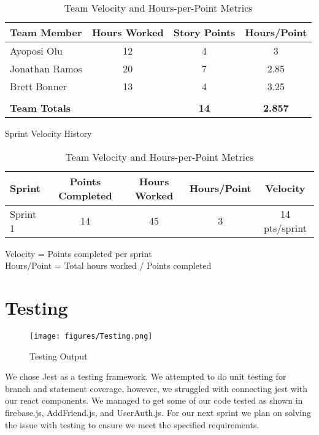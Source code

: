 \documentclass[12pt]{article} %
\begin{document}
\begin{table}[h]
\centering
\caption{Team Velocity and Hours-per-Point Metrics}
\begin{tabular}{|l|c|c|c|}
\hline
\textbf{Team Member} & \textbf{Hours Worked} & \textbf{Story Points} & \textbf{Hours/Point} \\
\hline
Ayoposi Olu & 12 & 4 & 3 \\
\hline
Jonathan Ramos & 20 & 7 & 2.85 \\
\hline
Brett Bonner & 13 & 4 & 3.25 \\
\hline
\multicolumn{4}{|c|}{} \\
\hline
\multicolumn{2}{|l|}{\textbf{Team Totals}} & \textbf{14} & \textbf{2.857} \\
\hline
\end{tabular}

\begin{center}
\small{Sprint Velocity History}
\end{center}
\begin{tabular}{|l|c|c|c|c|}
\hline
\textbf{Sprint} & \textbf{Points Completed} & \textbf{Hours Worked} & \textbf{Hours/Point} & \textbf{Velocity} \\
\hline
Sprint 1 & 14 & 45 & 3 & 14 pts/sprint \\
\hline
\end{tabular}

\vspace{0.5cm}
\begin{center}
\small{Velocity = Points completed per sprint \\
Hours/Point = Total hours worked / Points completed}
\end{center}
\end{table}

\newpage

\section {Testing}
\begin{figure}
    \centering
    \texttt{[image: figures/Testing.png]}
    \caption{Testing Output}
    \label{fig:enter-label}

\end{figure}
    We chose Jest as a testing framework. We attempted to do unit testing for branch and statement coverage, however, we struggled with connecting jest with our react components. We managed to get some of our code tested as shown in firebase.js, AddFriend.js, and UserAuth.js. For our next sprint we plan on solving the issue with testing to ensure we meet the specified requirements. 
\end{document}
